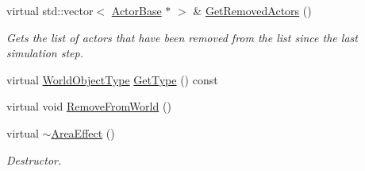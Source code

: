 \begin{DoxyCompactItemize}
virtual std::vector$<$ \hyperlink{classMezzanine_1_1ActorBase}{ActorBase} $\ast$ $>$ \& \hyperlink{classMezzanine_1_1AreaEffect_ac657b565ca47198c6fd900c8a588948b}{GetRemovedActors} ()
\begin{DoxyCompactList}\small\item\em Gets the list of actors that have been removed from the list since the last simulation step. \item\end{DoxyCompactList}\item 
virtual \hyperlink{namespaceMezzanine_a30335416fc857844e8360c84d1d1b56c}{WorldObjectType} \hyperlink{classMezzanine_1_1AreaEffect_a3eab7461632e01984cfb07f8c8fb5954}{GetType} () const 
\item 
virtual void \hyperlink{classMezzanine_1_1AreaEffect_aaf2aab50bfb000f3dfec58e97b423a29}{RemoveFromWorld} ()
\item 
virtual \hyperlink{classMezzanine_1_1AreaEffect_a1e825ce1dcb2d78c190b17d7bff7306c}{$\sim$AreaEffect} ()
\begin{DoxyCompactList}\small\item\em Destructor. \item\end{DoxyCompactList}\end{DoxyCompactItemize}
